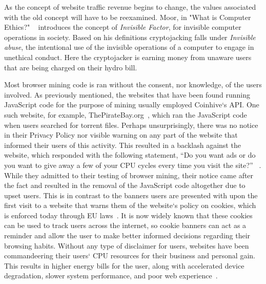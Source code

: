 As the concept of website traffic revenue begins to change, the values associated with the old concept will have to be reexamined. Moor, in "What is Computer Ethics?" ~\cite{moor1985computer} introduces the concept of \textit{Invisible Factor}, for invisible computer operations in society. Based on his definitions cryptojacking falls under \textit{Invisible abuse}, the intentional use of the invisible operations of a computer to engage in unethical conduct. Here the cryptojacker is earning money from unaware users that are being charged on their hydro bill. 

Most browser mining code is ran without the consent, nor knowledge, of the users involved. As previously mentioned, the websites that have been found running JavaScript code for the purpose of mining usually employed Coinhive`s API. One such website, for example, ThePirateBay.org~\cite{bbcmintcrypto}, which ran the JavaScript code when users searched for torrent files. Perhaps unsurprisingly, there was no notice in their Privacy Policy nor visible warning on any part of the website that informed their users of this activity. This resulted in a backlash against the website, which responded with the following statement, ``Do you want ads or do you want to give away a few of your CPU cycles every time you visit the site?'' ~\cite{piratesbayblog}. While they admitted to their testing of browser mining, their notice came after the fact and resulted in the removal of the JavaScript code altogether due to upset users. This is in contrast to the banners users are presented with upon the first visit to a website that warns them of the website`s policy on cookies, which is enforced today through EU laws~\cite{eucookie}. It is now widely known that these cookies can be used to track users across the internet, so cookie banners can act as a reminder and allow the user to make better informed decisions regarding their browsing habits. Without any type of disclaimer for users, websites have been commandeering their users` CPU resources for their business and personal gain. This results in higher energy bills for the user, along with accelerated device degradation, slower system performance, and poor web experience~\cite{httparchiveminingimpact}\cite{gaurdianelectricity}.


